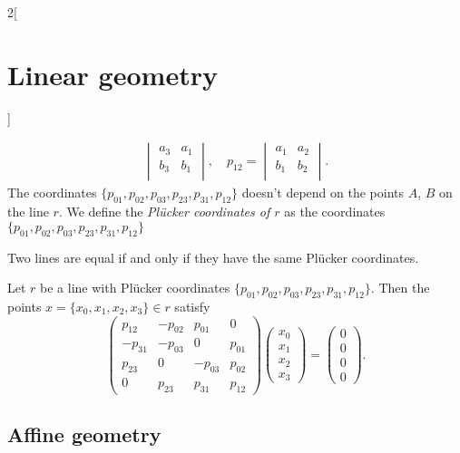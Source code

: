 \documentclass[../../../main.tex]{subfiles}
\begin{document}
\begin{multicols}{2}[\section{Linear geometry}]
\begin{prop}
\begin{gather*}
\begin{vmatrix}
                a_3 & a_1 \\
                b_3 & b_1 \\
            \end{vmatrix},\quad p_{12}=\begin{vmatrix}
                a_1 & a_2 \\
                b_1 & b_2 \\
            \end{vmatrix}.
        \end{gather*}
        The coordinates $\{p_{01},p_{02},p_{03},p_{23},p_{31},p_{12}\}$ doesn't depend on the points $A$, $B$ on the line $r$. We define the \textit{Plücker coordinates of $r$} as the coordinates $\{p_{01},p_{02},p_{03},p_{23},p_{31},p_{12}\}$
    \end{prop}
    \begin{prop}
        Two lines are equal if and only if they have the same Plücker coordinates.
    \end{prop}
    \begin{prop}
        Let $r$ be a line with Plücker coordinates $\{p_{01},p_{02},p_{03},p_{23},p_{31},p_{12}\}$. Then the points $x=\{x_0,x_1,x_2,x_3\}\in r$ satisfy $$\begin{pmatrix}
                p_{12}  & -p_{02} & p_{01}  & 0      \\
                -p_{31} & -p_{03} & 0       & p_{01} \\
                p_{23}  & 0       & -p_{03} & p_{02} \\
                0       & p_{23}  & p_{31}  & p_{12}
            \end{pmatrix}\begin{pmatrix}
                x_0 \\
                x_1 \\
                x_2 \\
                x_3
            \end{pmatrix}=\begin{pmatrix}
                0 \\
                0 \\
                0 \\
                0
            \end{pmatrix}.$$
    \end{prop}
    \subsection{Affine geometry}

\end{multicols}
\end{document}
